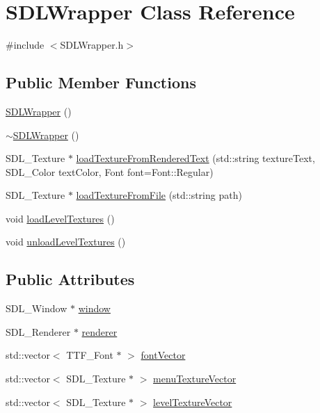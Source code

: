 \hypertarget{class_s_d_l_wrapper}{}\section{S\+D\+L\+Wrapper Class Reference}
\label{class_s_d_l_wrapper}


{\ttfamily \#include $<$S\+D\+L\+Wrapper.\+h$>$}

\subsection*{Public Member Functions}
\begin{DoxyCompactItemize}
\item 
\hyperlink{class_s_d_l_wrapper_a32326cfffe91c18fcda5fb8085521f5f}{S\+D\+L\+Wrapper} ()
\item 
\hyperlink{class_s_d_l_wrapper_aa361c10710aed3fb4fd6a29e426f9306}{$\sim$\+S\+D\+L\+Wrapper} ()
\item 
S\+D\+L\+\_\+\+Texture $\ast$ \hyperlink{class_s_d_l_wrapper_a80231a7b46fc17ee95742cff2d87a077}{load\+Texture\+From\+Rendered\+Text} (std\+::string texture\+Text, S\+D\+L\+\_\+\+Color text\+Color, Font font=Font\+::\+Regular)
\item 
S\+D\+L\+\_\+\+Texture $\ast$ \hyperlink{class_s_d_l_wrapper_a8688bdcb4c18bf2282535969a57bf2d2}{load\+Texture\+From\+File} (std\+::string path)
\item 
void \hyperlink{class_s_d_l_wrapper_adaf6d4024bf1753bf324ef36efb9c909}{load\+Level\+Textures} ()
\item 
void \hyperlink{class_s_d_l_wrapper_ae50abcb779f1523e17f3f78fd3f1375d}{unload\+Level\+Textures} ()
\end{DoxyCompactItemize}
\subsection*{Public Attributes}
\begin{DoxyCompactItemize}
\item 
S\+D\+L\+\_\+\+Window $\ast$ \hyperlink{class_s_d_l_wrapper_a04523181eb3d33d40468dd428def4518}{window}
\item 
S\+D\+L\+\_\+\+Renderer $\ast$ \hyperlink{class_s_d_l_wrapper_a743f32054f626218636044f2159bf39d}{renderer}
\item 
std\+::vector$<$ T\+T\+F\+\_\+\+Font $\ast$ $>$ \hyperlink{class_s_d_l_wrapper_a38b81e2c2a6b5e435b22dbda32d1fb7e}{font\+Vector}
\item 
std\+::vector$<$ S\+D\+L\+\_\+\+Texture $\ast$ $>$ \hyperlink{class_s_d_l_wrapper_abfc9572c6ae83287acab8e1c12edf438}{menu\+Texture\+Vector}
\item 
std\+::vector$<$ S\+D\+L\+\_\+\+Texture $\ast$ $>$ \hyperlink{class_s_d_l_wrapper_a7dbd8ea0a1d91fcf91aa7e6a467d1344}{level\+Texture\+Vector}
\end{DoxyCompactItemize}


